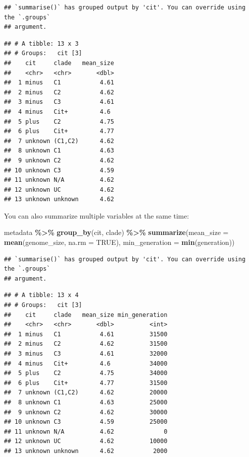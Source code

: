 \documentclass[
]{book}
\newenvironment{Shaded}{\begin{snugshade}}{\end{snugshade}}
\newcommand{\AttributeTok}[1]{\textcolor[rgb]{0.13,0.29,0.53}{#1}}
\newcommand{\ConstantTok}[1]{\textcolor[rgb]{0.56,0.35,0.01}{#1}}
\newcommand{\FunctionTok}[1]{\textcolor[rgb]{0.13,0.29,0.53}{\textbf{#1}}}
\newcommand{\NormalTok}[1]{#1}
\newcommand{\SpecialCharTok}[1]{\textcolor[rgb]{0.81,0.36,0.00}{\textbf{#1}}}
\begin{document}
\begin{verbatim}
## `summarise()` has grouped output by 'cit'. You can override using the `.groups`
## argument.
\end{verbatim}

\begin{verbatim}
## # A tibble: 13 x 3
## # Groups:   cit [3]
##    cit     clade   mean_size
##    <chr>   <chr>       <dbl>
##  1 minus   C1           4.61
##  2 minus   C2           4.62
##  3 minus   C3           4.61
##  4 minus   Cit+         4.6 
##  5 plus    C2           4.75
##  6 plus    Cit+         4.77
##  7 unknown (C1,C2)      4.62
##  8 unknown C1           4.63
##  9 unknown C2           4.62
## 10 unknown C3           4.59
## 11 unknown N/A          4.62
## 12 unknown UC           4.62
## 13 unknown unknown      4.62
\end{verbatim}

You can also summarize multiple variables at the same time:

\begin{Shaded}
\begin{Highlighting}[]
\NormalTok{metadata }\SpecialCharTok{\%\textgreater{}\%}
  \FunctionTok{group\_by}\NormalTok{(cit, clade) }\SpecialCharTok{\%\textgreater{}\%}
  \FunctionTok{summarize}\NormalTok{(}\AttributeTok{mean\_size =} \FunctionTok{mean}\NormalTok{(genome\_size, }\AttributeTok{na.rm =} \ConstantTok{TRUE}\NormalTok{),}
            \AttributeTok{min\_generation =} \FunctionTok{min}\NormalTok{(generation))}
\end{Highlighting}
\end{Shaded}

\begin{verbatim}
## `summarise()` has grouped output by 'cit'. You can override using the `.groups`
## argument.
\end{verbatim}

\begin{verbatim}
## # A tibble: 13 x 4
## # Groups:   cit [3]
##    cit     clade   mean_size min_generation
##    <chr>   <chr>       <dbl>          <int>
##  1 minus   C1           4.61          31500
##  2 minus   C2           4.62          31500
##  3 minus   C3           4.61          32000
##  4 minus   Cit+         4.6           34000
##  5 plus    C2           4.75          34000
##  6 plus    Cit+         4.77          31500
##  7 unknown (C1,C2)      4.62          20000
##  8 unknown C1           4.63          25000
##  9 unknown C2           4.62          30000
## 10 unknown C3           4.59          25000
## 11 unknown N/A          4.62              0
## 12 unknown UC           4.62          10000
## 13 unknown unknown      4.62           2000
\end{verbatim}
\end{document}
